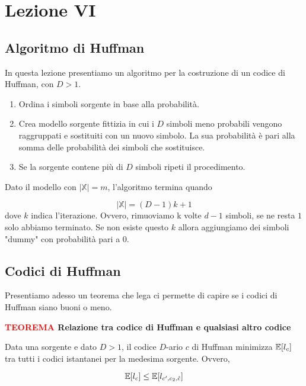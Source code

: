 \documentclass[12pt]{report}
\begin{document}
    \chapter{Lezione VI}


    \section{Algoritmo di Huffman}

    In questa lezione presentiamo un algoritmo per la costruzione di un codice di Huffman, con $D > 1$.

    \begin{enumerate}
        \item Ordina i simboli sorgente in base alla probabilità.
        \item Crea modello sorgente fittizia in cui i $D$ simboli meno probabili vengono raggruppati e sostituiti con un nuovo simbolo. La sua probabilità è pari alla somma delle probabilità dei simboli che sostituisce.
        \item Se la sorgente contene più di $D$ simboli ripeti il procedimento.
    \end{enumerate}
    Dato il modello \modello con $|\mathbb{X}| = m$, l'algoritmo termina quando

    $$|\mathbb{X}| = (D-1)k + 1$$
    dove $k$ indica l'iterazione. Ovvero, rimuoviamo k volte $d-1$ simboli, se ne resta $1$ solo abbiamo terminato. Se non esiste questo $k$ allora aggiungiamo dei simboli "dummy" con probabilità pari a $0$.

    \newpage
    \section{Codici di Huffman}

    Presentiamo adesso un teorema che lega ci permette di capire se i codici di Huffman siano buoni o meno.

    \begin{tcolorbox}
        \textbf{\textcolor{red}{TEOREMA} Relazione tra codice di Huffman e qualsiasi altro codice}
        \vspace{5px}
        \begin{center}
            Data una sorgente \modello e dato $D > 1$, il codice $D$-ario $c$ di Huffman minimizza $\mathbb{E}[l_c]$ tra tutti i codici istantanei per la medesima sorgente. Ovvero,

            $$\mathbb{E}[l_c] \leq \mathbb{E}[l_{c',c_2,\tilde c}]$$
        \end{center}
    \end{tcolorbox}
\end{document}
